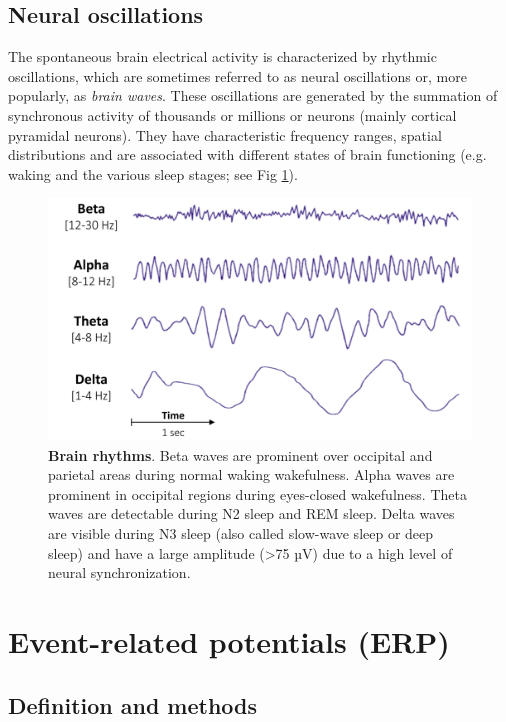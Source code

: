 \subsection{Neural oscillations}
\label{sec:eeg:eeg:neural}

The spontaneous brain electrical activity is characterized by rhythmic oscillations, which are sometimes referred to as neural oscillations or, more popularly, as \emph{brain waves}. These oscillations are generated by the summation of synchronous activity of thousands or millions or neurons (mainly cortical pyramidal neurons). They have characteristic frequency ranges, spatial distributions and are associated with different states of brain functioning (e.g. waking and the various sleep stages; see Fig \ref{fig:methods:neural}).

\begin{figure}[htb]
	\includegraphics[width=\textwidth]{Fig/Methods/EEG_BrainWaves/EEG_Brain_Waves.png}
	\caption[Brain rhythms]{\textbf{Brain rhythms}. Beta waves are prominent over occipital and parietal areas during normal waking wakefulness. Alpha waves are prominent in occipital regions during eyes-closed wakefulness. Theta waves are detectable during N2 sleep and REM sleep. Delta waves are visible during N3 sleep (also called slow-wave sleep or deep sleep) and have a large amplitude (>75 µV) due to a high level of neural synchronization.}
	\label{fig:methods:neural}
\end{figure}

\section{Event-related potentials (ERP)}
\label{sec:eeg:erp}

\subsection{Definition and methods}
\label{sec:eeg:erp:def}

